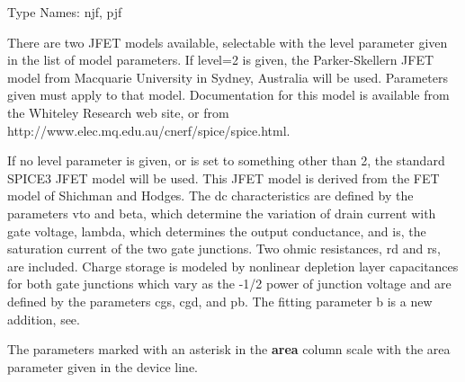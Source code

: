 
{\cb Type Names:} {\vt njf}, {\vt pjf}

There are two JFET models available, selectable with the {\vt level}
parameter given in the list of model parameters.  If {\vt level=2} is
given, the Parker-Skellern JFET model from Macquarie University in
Sydney, Australia will be used.  Parameters given must apply to that
model.  Documentation for this model is available from the Whiteley
Research web site, or from\\
{\vt http://www.elec.mq.edu.au/cnerf/spice/spice.html}.

If no {\vt level} parameter is given, or is set to something
other than 2, the standard SPICE3 JFET model will be used.
This JFET model is derived from the FET model of Shichman and Hodges.
The dc characteristics are defined by the parameters {\vt vto} and
{\vt beta}, which determine the variation of drain current with gate
voltage, {\vt lambda}, which determines the output
conductance, and {\vt is}, the saturation current of the
two gate junctions.  Two ohmic resistances, {\vt rd} and {\vt rs}, are
included.  Charge storage is modeled by nonlinear depletion layer
capacitances for both gate junctions which vary as the -1/2 power of
junction voltage and are defined by the parameters {\vt cgs}, {\vt
cgd}, and {\vt pb}.  The fitting parameter {\vt b} is a new addition,
see\cite{parker}.

The parameters marked with an asterisk in the {\bf area} column
scale with the {\vt area} parameter given in the device line.

